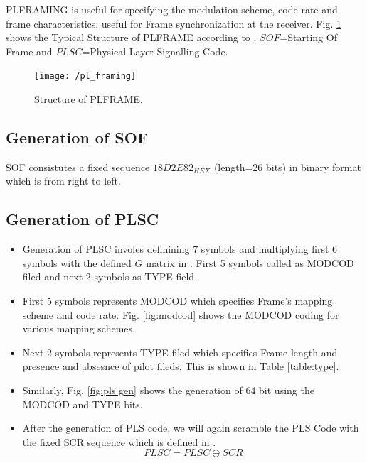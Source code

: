 \documentclass[journal,12pt,twocolumn]{IEEEtran}
\begin{document}
PLFRAMING is useful for  specifying the modulation scheme,  code rate and frame characteristics, useful for Frame synchronization at the receiver.  Fig. \ref{fig:splframe} shows the Typical Structure of PLFRAME according to \cite{dvb}.
$SOF$=Starting Of Frame and  $PLSC$=Physical Layer Signalling Code.

\begin{figure}[!ht]
\begin{center}
\texttt{[image: /pl\_framing]}
\end{center}
\caption{Structure of PLFRAME.}
\label{fig:splframe}
\end{figure}
%
\subsection{Generation of SOF}
SOF consistutes a fixed sequence $18D2E82_{HEX}$ (length=26 bits) in binary format which is from right to left.

\subsection{Generation of PLSC}
\begin{itemize}
\item Generation of PLSC involes definining 7 symbols and multiplying first 6 symbols with the defined $G$ matrix in \cite{dvb}. First 5 symbols called as MODCOD filed and next 2 symbols as TYPE field.
\item First 5 symbols represents MODCOD which specifies Frame's mapping scheme and code rate.  Fig. \ref{fig:modcod} shows the MODCOD coding for various mapping schemes.
\item Next 2 symbols represents TYPE filed which specifies Frame length and presence and absesnce of pilot fileds.
This is shown in Table \ref{table:type}.
\item  Similarly, Fig. \ref{fig:pls gen} shows the generation of 64 bit using the MODCOD and TYPE bits.
\item  After the generation of PLS code, we will again scramble the PLS Code with the fixed SCR sequence which is defined in \cite{dvb}.
\begin{equation}
PLSC=PLSC \oplus SCR
\end{equation}
 

\end{itemize}
%
\end{document}
